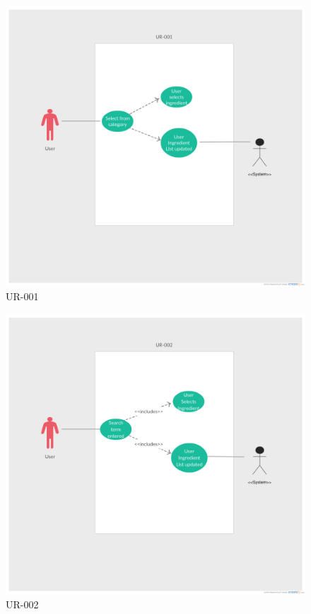 \documentclass[12pt]{article}
\begin{document}
 \newpage
 \begin{figure}
   \includegraphics[width=\linewidth]{UR-001.png}
   \caption{UR-001}
   \label{fig:UR-001}
 \end{figure}
 \newpage
 \begin{figure}
   \includegraphics[width=\linewidth]{UR-002.png}
   \caption{UR-002}
   \label{fig:UR-002}
 \end{figure}
\end{document}
